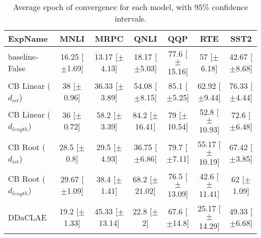 \begin{table*}[ht]
\centering
\begingroup\small
\begin{tabular}{lcccccc}
  \hline
ExpName & MNLI & MRPC & QNLI & QQP & RTE & SST2 \\ 
  \hline
baseline-False & 16.25 [$\pm$1.69] & 13.17 [$\pm$4.13] & 18.17 [$\pm$5.03] & 77.6 [$\pm$15.16] & 57 [$\pm$6.18] & 42.67 [$\pm$8.68] \\ 
  CB Linear ($d_{irt}$) & 38 [$\pm$0.96] & 36.33 [$\pm$3.89] & 54.08 [$\pm$8.15] & 85.1 [$\pm$5.25] & 62.92 [$\pm$9.44] & 76.33 [$\pm$4.44] \\ 
  CB Linear ($d_{length}$) & 36 [$\pm$0.72] & 58.2 [$\pm$3.39] & 84.2 [$\pm$16.41] & 79 [$\pm$10.54] & 52.8 [$\pm$10.93] & 72.6 [$\pm$6.48] \\ 
  CB Root ($d_{irt}$) & 28.5 [$\pm$0.8] & 29.5 [$\pm$4.93] & 36.75 [$\pm$6.86] & 79.7 [$\pm$7.11] & 55.17 [$\pm$10.19] & 67.42 [$\pm$3.85] \\ 
  CB Root ($d_{length}$) & 29.67 [$\pm$1.09] & 38.4 [$\pm$1.41] & 68.2 [$\pm$21.02] & 76.5 [$\pm$13.09] & 42.6 [$\pm$11.41] & 62 [$\pm$1.09] \\ 
  DDaCLAE & 19.2 [$\pm$1.33] & 45.33 [$\pm$13.14] & 22.8 [$\pm$2] & 67.6 [$\pm$14.8] & 25.17 [$\pm$14.29] & 49.33 [$\pm$6.68] \\ 
   \hline
\end{tabular}
\endgroup
\caption{Average epoch of convergence for each model, with 95\% confidence intervals.} 
\label{tab:epoch_lstm-True}
\end{table*}
